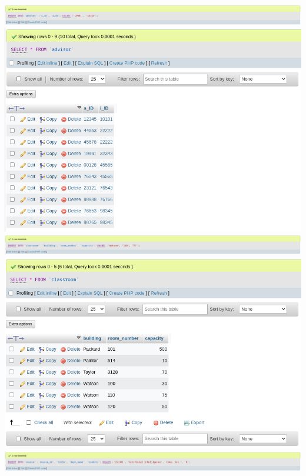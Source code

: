 \documentclass{article}
\begin{document}
\section{}
\begin{center}
    \includegraphics[scale=0.5]{7-1i.png}
    \includegraphics[scale=0.5]{7-1s.png}
    \newpage
    \includegraphics[scale=0.5]{7-2i.png}
    \includegraphics[scale=0.5]{7-2s.png}
    \newpage
    \includegraphics[scale=0.5]{7-3i.png}

\end{center}
\end{document}
